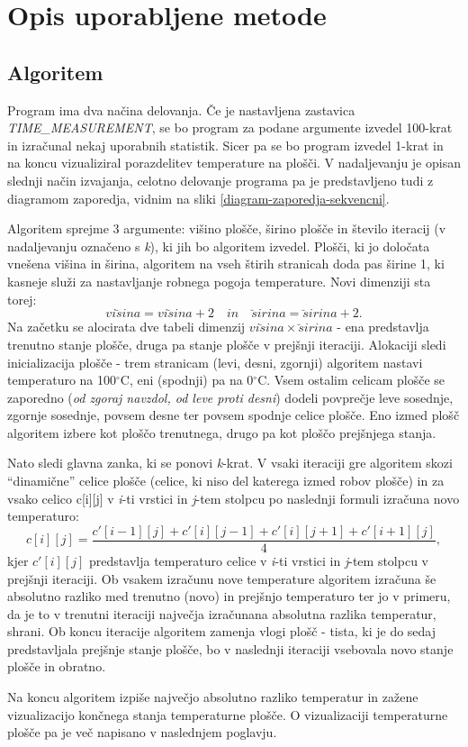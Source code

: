 \documentclass[a4paper,11pt]{article}
\begin{document}
\section{Opis uporabljene metode}
\subsection{Algoritem}
Program ima dva načina delovanja. Če je nastavljena zastavica \textit{TIME\_MEASUREMENT}, se bo program za podane argumente izvedel 100-krat in izračunal nekaj uporabnih statistik. Sicer pa se bo program izvedel 1-krat in na koncu vizualiziral porazdelitev temperature na plošči. V nadaljevanju je opisan slednji način izvajanja, celotno delovanje programa pa je predstavljeno tudi z diagramom zaporedja, vidnim na sliki \ref{diagram-zaporedja-sekvencni}.
\indent \par Algoritem sprejme 3 argumente: višino plošče, širino plošče in število iteracij (v nadaljevanju označeno s \textit{k}), ki jih bo algoritem izvedel. Plošči, ki jo določata vnešena višina in širina, algoritem na vseh štirih stranicah doda pas širine 1, ki kasneje služi za nastavljanje robnega pogoja temperature. Novi dimenziji sta torej: 
\[
vi\breve{s}ina = vi\breve{s}ina + 2 \quad in \quad \breve{s}irina = \breve{s}irina + 2.
\]
Na začetku se alocirata dve tabeli dimenzij $ vi\breve{s}ina \times \breve{s}irina$ - ena predstavlja trenutno stanje plošče, druga pa stanje plošče v prejšnji iteraciji. Alokaciji sledi inicializacija plošče - trem stranicam (levi, desni, zgornji) algoritem nastavi temperaturo na 100$^{\circ}$C, eni (spodnji) pa na 0$^{\circ}$C. Vsem ostalim celicam plošče se zaporedno (\textit{od zgoraj navzdol, od leve proti desni}) dodeli povprečje leve sosednje, zgornje sosednje, povsem desne ter povsem spodnje celice plošče. Eno izmed plošč algoritem izbere kot ploščo trenutnega, drugo pa kot ploščo prejšnjega stanja.
\indent \par Nato sledi glavna zanka, ki se ponovi \textit{k}-krat. V vsaki iteraciji gre algoritem skozi ``dinamične'' celice plošče (celice, ki niso del katerega izmed robov plošče) in za vsako celico c[i][j] v \textit{i}-ti vrstici in \textit{j}-tem stolpcu po naslednji formuli izračuna novo temperaturo:
\[ c[i][j] = \frac{c'[i - 1][j] + c'[i][j - 1] + c'[i][j + 1] + c'[i + 1][j]}{4},\]
kjer $c'[i][j]$ predstavlja temperaturo celice v \textit{i}-ti vrstici in \textit{j}-tem stolpcu v prejšnji iteraciji. Ob vsakem izračunu nove temperature algoritem izračuna še absolutno razliko med trenutno (novo) in prejšnjo temperaturo ter jo v primeru, da je to v trenutni iteraciji največja izračunana absolutna razlika temperatur, shrani. Ob koncu iteracije algoritem zamenja vlogi plošč - tista, ki je do sedaj predstavljala prejšnje stanje plošče, bo v naslednji iteraciji vsebovala novo stanje plošče in obratno.
\indent \par Na koncu algoritem izpiše največjo absolutno razliko temperatur in zažene vizualizacijo končnega stanja temperaturne plošče. O vizualizaciji temperaturne plošče pa je več napisano v naslednjem poglavju.
\end{document}
